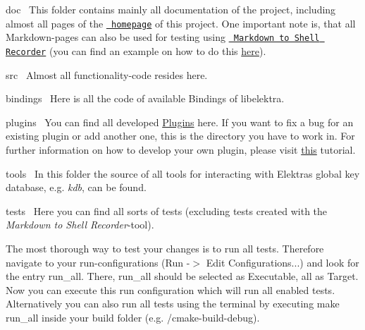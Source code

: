\begin{DoxyItemize}
\item doc~\newline
 This folder contains mainly all documentation of the project, including almost all pages of the \href{https://www.libelektra.org}{\texttt{ homepage}} of this project. One important note is, that all Markdown-\/pages can also be used for testing using \href{https://github.com/ElektraInitiative/libelektra/tree/master/tests/shell/shell_recorder/tutorial_wrapper}{\texttt{ Markdown to Shell Recorder}} (you can find an example on how to do this \mbox{\hyperlink{doc_help_kdb-get_md}{here}}).
\item src~\newline
 Almost all functionality-\/code resides here.
\begin{DoxyItemize}
\item bindings~\newline
 Here is all the code of available Bindings of libelektra.
\item plugins~\newline
 You can find all developed \mbox{\hyperlink{src_plugins_README_md}{Plugins}} here. If you want to fix a bug for an existing plugin or add another one, this is the directory you have to work in. For further information on how to develop your own plugin, please visit \mbox{\hyperlink{doc_tutorials_plugins_md}{this}} tutorial.
\item tools~\newline
 In this folder the source of all tools for interacting with Elektra\textquotesingle{}s global key database, e.\+g. {\itshape kdb}, can be found.
\end{DoxyItemize}
\item tests~\newline
 Here you can find all sorts of tests (excluding tests created with the {\itshape Markdown to Shell Recorder}-\/tool).
\end{DoxyItemize}

The most thorough way to test your changes is to run all tests. Therefore navigate to your run-\/configurations (Run -\/$>$ Edit Configurations...) and look for the entry {\ttfamily run\+\_\+all}. There, {\ttfamily run\+\_\+all} should be selected as {\ttfamily Executable}, {\ttfamily all} as {\ttfamily Target}. Now you can execute this run configuration which will run all enabled tests. Alternatively you can also run all tests using the terminal by executing {\ttfamily make run\+\_\+all} inside your build folder (e.\+g. /cmake-\/build-\/debug).

